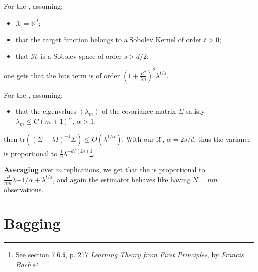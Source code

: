 \documentclass[
11pt,notheorems,hyperref={pdfauthor=whatever}
]{beamer}
\begin{document}
\begin{frame}    
    For the , assuming:
    \begin{itemize}
        \item \(\mathcal{X}=\mathbb{R}^d\);
        \item that the target function belongs to a Sobolev Kernel of order \(t>0\);
        \item that \(\mathcal{H}\) is a Sobolev space of order \(s>d/2\); 
    \end{itemize}
    one gets that the bias term is of order \(\left(1+\frac{R^2}{\lambda n}\right)^2\lambda^{t/s}\). 
    
    For the , assuming:
    \begin{itemize}
        \item that the eigenvalues \((\lambda_m)\) of the covariance matrix \(\Sigma\) satisfy \(\lambda_m\leq C(m+1)^{\alpha}\), \(\alpha>1\);
    \end{itemize} 
    then \(\text{tr}\left(\left(\Sigma+\lambda I\right)^{-1}\Sigma\right)\leq O(\lambda^{1/\alpha})\). With our \(\mathcal{X}\), \(\alpha=2s/d\), thus the variance is proportional to \(\frac{1}{n}\lambda^{-d/(2s)}\)\footnote{See section 7.6.6, p. 217 \textit{Learning Theory from First Principles}, by \textit{Francis Bach}.}.

    \alert{\textbf{Averaging}} over \(m\) replications, we get that the  is proportional to \(\frac{\sigma^2}{nm}\lambda{-1/\alpha}+\lambda^{t/s}\), and again the estimator behaves like having \(N=nm\) observations.
\end{frame}

\section{Bagging}
\end{document}
